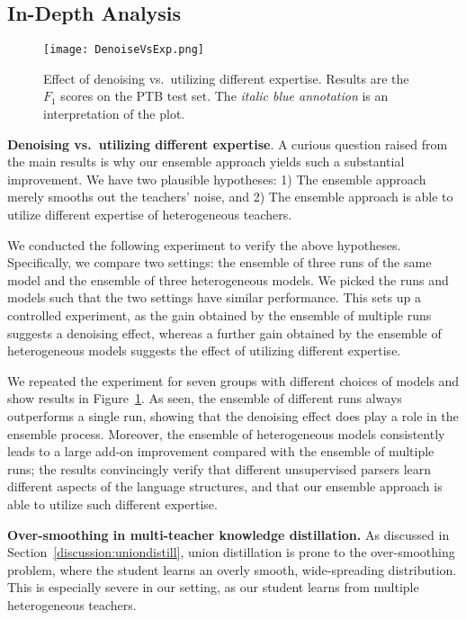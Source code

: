 \documentclass{article}
\begin{document}
\subsection{In-Depth Analysis}
\label{ss:analysis}
\begin{figure}[!b]
\begin{center}
\texttt{[image: DenoiseVsExp.png]}
\end{center}\vspace{-10pt}
\caption{Effect of denoising vs.~utilizing different expertise. Results are the $F_1$ scores on the PTB test set. The {\color{blue} \textit{italic blue annotation}} is an interpretation of the plot.}
\label{fig:denoisingvsexp}
\end{figure}

\textbf{Denoising vs.~utilizing different expertise}. A curious question raised from the main results is why our ensemble approach yields such a substantial improvement. We have two plausible hypotheses: 1) The ensemble approach merely smooths out the teachers' noise, and 2) The ensemble approach is able to utilize different expertise of heterogeneous teachers.

We conducted the following experiment to verify the above hypotheses. Specifically, we compare two settings: the ensemble of three runs of the same model and the ensemble of three heterogeneous models. We picked the runs and models such that the two settings have similar performance. This sets up a controlled experiment, as the gain obtained by the ensemble of multiple runs suggests a denoising effect, whereas a further gain obtained by the ensemble of heterogeneous models suggests the effect of utilizing different expertise.

We repeated the experiment for seven groups with different choices of models and show results in Figure~\ref{fig:denoisingvsexp}. As seen, the ensemble of different runs always outperforms a single run, showing that the denoising effect does play a role in the ensemble process. Moreover, the ensemble of heterogeneous models consistently leads to a large add-on improvement compared with the ensemble of multiple runs; the results convincingly verify that different unsupervised parsers learn different aspects of the language structures, and that our ensemble approach is able to utilize such different expertise.


\textbf{Over-smoothing in multi-teacher knowledge distillation.} As discussed in Section~\ref{discussion:uniondistill}, union distillation is prone to the over-smoothing problem, where the student learns an overly smooth, wide-spreading distribution. This is especially severe in our setting, as our student learns from multiple heterogeneous teachers. 
\end{document}
